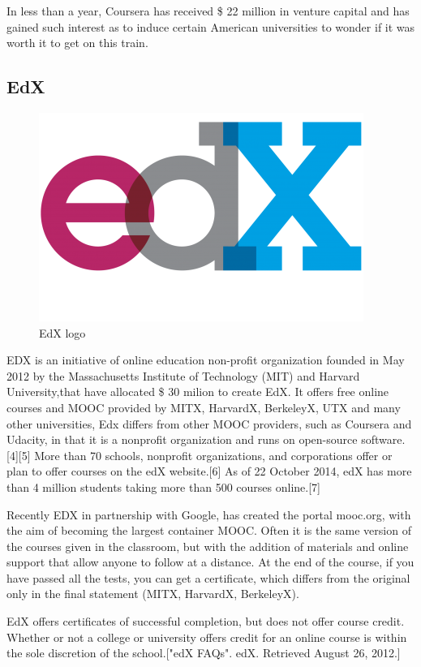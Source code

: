 In less than a year, Coursera has received \$ 22 million in venture capital and has gained such interest as to induce certain American universities to wonder if it was worth it to get on this train.

\subsection{EdX}
\label{subsec:EdX}
\begin{figure}[htb] %
 \centering
 \includegraphics[width=0.5\linewidth]{images/chapter1/edx_logo.png}\hfill
 \caption[EdX logo]{EdX logo}
 \label{fig:fourV}
\end{figure}

EDX is an initiative of online education non-profit organization founded in May 2012 by the Massachusetts Institute of Technology (MIT) and Harvard University,that have allocated \$ 30 milion to create EdX.
It offers free online courses and MOOC provided by MITX, HarvardX, BerkeleyX, UTX and many other universities, Edx differs from other MOOC providers, such as Coursera and Udacity, in that it is a nonprofit organization and runs on open-source software.[4][5]
More than 70 schools, nonprofit organizations, and corporations offer or plan to offer courses on the edX website.[6] 
As of 22 October 2014, edX has more than 4 million students taking more than 500 courses online.[7]

Recently EDX in partnership with Google, has created the portal mooc.org, with the aim of becoming the largest container MOOC.
Often it is the same version of the courses given in the classroom, but with the addition of materials and online support that allow anyone to follow at a distance. At the end of the course, if you have passed all the tests, you can get a certificate, which differs from the original only in the final statement (MITX, HarvardX, BerkeleyX).


EdX offers certificates of successful completion, but does not offer course credit. Whether or not a college or university offers credit for an online course is within the sole discretion of the school.["edX FAQs". edX. Retrieved August 26, 2012.]

